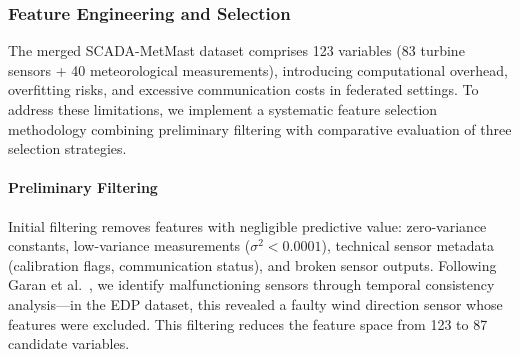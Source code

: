 \documentclass[12pt]{article}
\begin{document}


\subsubsection{Feature Engineering and Selection}
\label{subsubsec:feature_selection}

The merged SCADA-MetMast dataset comprises 123 variables (83 turbine sensors + 40 meteorological measurements), introducing computational overhead, overfitting risks, and excessive communication costs in federated settings. To address these limitations, we implement a systematic feature selection methodology combining preliminary filtering with comparative evaluation of three selection strategies.

\paragraph{Preliminary Filtering}

Initial filtering removes features with negligible predictive value: zero-variance constants, low-variance measurements ($\sigma^2 < 0.0001$), technical sensor metadata (calibration flags, communication status), and broken sensor outputs. Following Garan et al.~\cite{1}, we identify malfunctioning sensors through temporal consistency analysis—in the EDP dataset, this revealed a faulty wind direction sensor whose features were excluded. This filtering reduces the feature space from 123 to 87 candidate variables.
\end{document}
